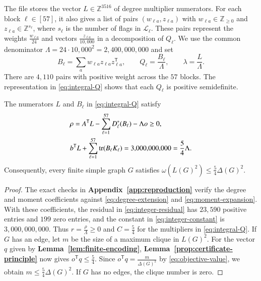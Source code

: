 The file  stores
the vector $L\in\mathbb Z^{3516}$ of degree multiplier numerators.
For each block $\ell\in[57]$, it also gives a list of pairs
$(w_{\ell a},z_{\ell a})$ with $w_{\ell a}\in\mathbb Z_{\geq0}$ and
$z_{\ell a}\in\mathbb Z^{s_\ell}$, where $s_\ell$ is the number of
flags in $\mathcal L_\ell$. These pairs represent the weights
$\frac{w_{\ell a}}{24}$ and vectors $\frac{z_{\ell a}}{10{,}000}$
in a decomposition of $Q_\ell$. We use the common
denominator $\Lambda=24\cdot10{,}000^2=2{,}400{,}000{,}000$ and set
\begin{equation}\label{eq:integral-Q}
 B_\ell=\sum_a w_{\ell a}z_{\ell a}z_{\ell a}^{\mathsf T},
 \qquad Q_\ell=\frac{B_\ell}{\Lambda},
 \qquad \lambda=\frac{L}{\Lambda}.
\end{equation}
There are $4{,}110$ pairs with positive weight across the $57$ blocks.
The representation in \eqref{eq:integral-Q} shows that each $Q_\ell$
is positive semidefinite.

\begin{lemma}\label{prop:checked-certificate}\label{prop:quadratic-bound}\label{lem:rational-witness}
The numerators $L$ and $B_\ell$ in \eqref{eq:integral-Q} satisfy
\begin{align}
 &\rho=A^{\mathsf T}L-\sum_{\ell=1}^{57}D_\ell^*(B_\ell)
                  -\Lambda o\geq0,\label{eq:integer-residual}\\
 &b^{\mathsf T}L+\sum_{\ell=1}^{57}\operatorname{tr}(B_\ell K_\ell)
     =3{,}000{,}000{,}000=\frac{5}{4}\Lambda.
       \label{eq:integer-constant}
\end{align}
Consequently, every finite simple graph $G$ satisfies
$\omega(L(G)^2)\leq\frac{5}{4}\Delta(G)^2$.
\end{lemma}

\begin{proof}
The exact checks in \textbf{Appendix~\ref{app:reproduction}} verify the
degree and moment coefficients against \eqref{eq:degree-extension}
and \eqref{eq:moment-expansion}. With these coefficients, the
residual in \eqref{eq:integer-residual} has $23{,}590$ positive entries
and $199$ zero entries, and the constant in \eqref{eq:integer-constant}
is $3{,}000{,}000{,}000$. Thus $r=\frac{\rho}{\Lambda}\geq0$ and
$C=\frac{5}{4}$ for the multipliers in \eqref{eq:integral-Q}.
If $G$ has an edge, let $m$ be the size of a maximum clique in $L(G)^2$.
For the vector $q$ given by \textbf{Lemma~\ref{lem:finite-encoding}},
\textbf{Lemma~\ref{prop:certificate-principle}} now gives
$o^{\mathsf T}q\leq\frac{5}{4}$.
Since $o^{\mathsf T}q=\frac{m}{\Delta(G)^2}$ by \eqref{eq:objective-value},
we obtain $m\leq\frac{5}{4}\Delta(G)^2$.
If $G$ has no edges, the clique number is zero.
\end{proof}

